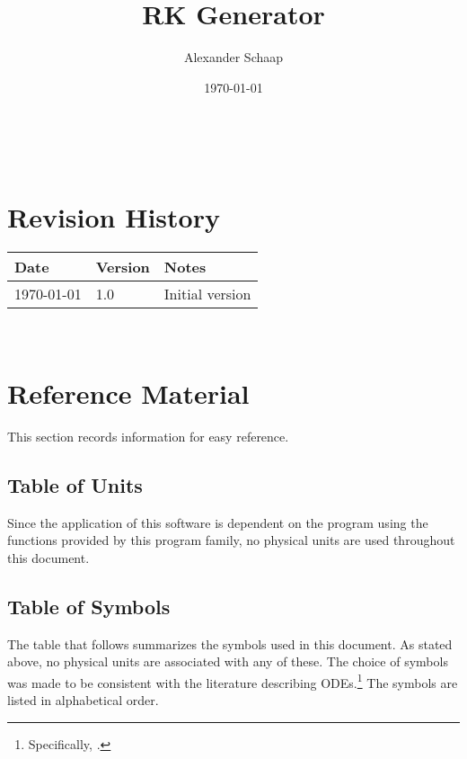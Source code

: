 \documentclass[12pt]{article}
\begin{document}
\title{RK Generator} 
\author{Alexander Schaap}
\date{\today}

\maketitle

~\newpage


\section{Revision History}

\begin{tabularx}{\textwidth}{p{3cm}p{2cm}X}
\toprule {\bf Date} & {\bf Version} & {\bf Notes}\\
\midrule
\today & 1.0 & Initial version\\
\bottomrule
\end{tabularx}

~\newpage
	
\section{Reference Material}

This section records information for easy reference.

\subsection{Table of Units}

Since the application of this software is dependent on the program using the 
functions provided by this program family, no physical units are used 
throughout this document.

\subsection{Table of Symbols}\label{ssec:symbols}

The table that follows summarizes the symbols used in this document. As stated 
above, no physical units are associated with any of these.  The choice of 
symbols was made to be consistent with the 
literature describing ODEs.\footnote{Specifically, 
\cite{corless_graduate_2013}.}  The symbols are listed in alphabetical order.
\end{document}
